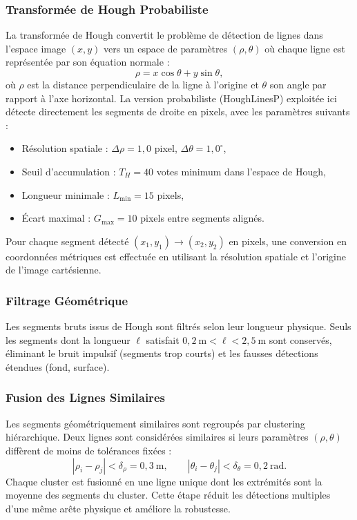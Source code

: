 \subsubsection*{Transformée de Hough Probabiliste}

La transformée de Hough convertit le problème de détection de lignes dans l'espace image $(x,y)$ vers un espace de paramètres $(\rho, \theta)$ où chaque ligne est représentée par son équation normale :
\[
\rho = x \cos\theta + y \sin\theta,
\]
où $\rho$ est la distance perpendiculaire de la ligne à l'origine et $\theta$ son angle par rapport à l'axe horizontal. La version probabiliste (HoughLinesP) exploitée ici détecte directement les segments de droite en pixels, avec les paramètres suivants :
\begin{itemize}
    \item Résolution spatiale : $\Delta\rho = 1{,}0$ pixel, $\Delta\theta = 1{,}0^{\circ}$,
    \item Seuil d'accumulation : $T_H = 40$ votes minimum dans l'espace de Hough,
    \item Longueur minimale : $L_{\min} = 15$ pixels,
    \item Écart maximal : $G_{\max} = 10$ pixels entre segments alignés.
\end{itemize}

Pour chaque segment détecté $(x_1, y_1) \rightarrow (x_2, y_2)$ en pixels, une conversion en coordonnées métriques est effectuée en utilisant la résolution spatiale et l'origine de l'image cartésienne.

\subsubsection*{Filtrage Géométrique}

Les segments bruts issus de Hough sont filtrés selon leur longueur physique. Seuls les segments dont la longueur $\ell$ satisfait $0{,}2~\text{m} < \ell < 2{,}5~\text{m}$ sont conservés, éliminant le bruit impulsif (segments trop courts) et les fausses détections étendues (fond, surface).

\subsubsection*{Fusion des Lignes Similaires}

Les segments géométriquement similaires sont regroupés par clustering hiérarchique. Deux lignes sont considérées similaires si leurs paramètres $(\rho, \theta)$ diffèrent de moins de tolérances fixées :
\[
|\rho_i - \rho_j| < \delta_\rho = 0{,}3~\text{m}, \qquad
|\theta_i - \theta_j| < \delta_\theta = 0{,}2~\text{rad}.
\]
Chaque cluster est fusionné en une ligne unique dont les extrémités sont la moyenne des segments du cluster. Cette étape réduit les détections multiples d'une même arête physique et améliore la robustesse.

